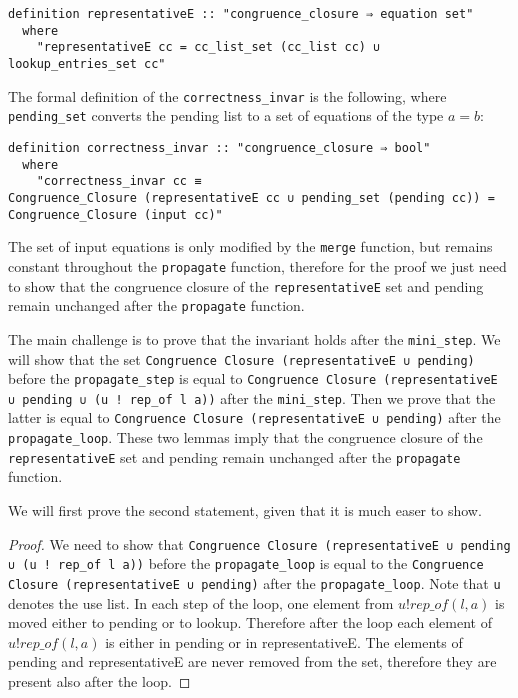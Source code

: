 \begin{lstlisting}
definition representativeE :: "congruence_closure ⇒ equation set"
  where
    "representativeE cc = cc_list_set (cc_list cc) ∪ lookup_entries_set cc"
\end{lstlisting}

The formal definition of the \lstinline|correctness_invar| is the following, where \lstinline{pending_set} converts the pending list to a set of equations of the type $a = b$:

\begin{lstlisting}
definition correctness_invar :: "congruence_closure ⇒ bool"
  where
    "correctness_invar cc ≡
Congruence_Closure (representativeE cc ∪ pending_set (pending cc)) = Congruence_Closure (input cc)"
\end{lstlisting}

The set of input equations is only modified by the \lstinline{merge} function, but remains constant throughout the \lstinline{propagate} function, therefore for the proof we just need to show that the congruence closure of the \lstinline{representativeE} set and pending remain unchanged after the \lstinline{propagate} function.

The main challenge is to prove that the invariant holds after the \lstinline{mini_step}. We will show that the set \lstinline{Congruence Closure (representativeE ∪ pending)} before the \lstinline{propagate_step} is equal to \lstinline{Congruence Closure (representativeE ∪ pending ∪ (u ! rep_of l a))} after the \lstinline{mini_step}.
Then we prove that the latter is equal to \lstinline{Congruence Closure (representativeE ∪ pending)}  after the \lstinline{propagate_loop}.
These two lemmas imply that the congruence closure of the \lstinline{representativeE} set and pending remain unchanged after the \lstinline{propagate} function.

We will first prove the second statement, given that it is much easer to show.

\begin{proof}
We need to show that
\lstinline{Congruence Closure (representativeE ∪ pending ∪ (u ! rep_of l a))}
before the
\lstinline{propagate_loop} is equal to the
\lstinline{Congruence Closure (representativeE ∪ pending)}  after the \lstinline{propagate_loop}.
Note that \lstinline|u| denotes the use list.
In each step of the loop, one element from $u ! rep\_of(l, a)$ is moved either to pending or to lookup. Therefore after the loop each element of $u ! rep\_of(l, a)$ is either in pending or in representativeE. The elements of pending and representativeE are never removed from the set, therefore they are present also after the loop.
\end{proof}

